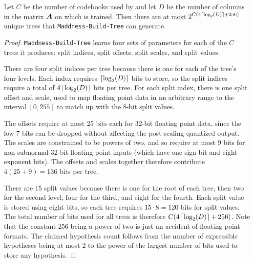 \begin{lemma} \label{lemma:ntrees}
Let $C$ be the number of codebooks used by \oursp and let $D$ be the number of columns in the matrix $\tilde{\bm{A}}$ on which \oursp is trained. Then there are at most $2^{C (4\left \lceil \log_2(D) \right \rceil + 256)}$ unique trees that \texttt{Maddness-Build-Tree} can generate.
\end{lemma}
\begin{proof}
\texttt{Maddness-Build-Tree} learns four sets of parameters for each of the $C$ trees it produces: split indices, split offsets, split scales, and split values.

There are four split indices per tree because there is one for each of the tree's four levels. Each index requires $\left \lceil \log_2(D) \right \rceil$ bits to store, so the split indices require a total of $4 \left \lceil \log_2(D) \right \rceil$ bits per tree. For each split index, there is one split offset and scale, used to map floating point data in an arbitrary range to the interval $[0, 255]$ to match up with the 8-bit split values.

The offsets require at most 25 bits each for 32-bit floating point data, since the low 7 bits can be dropped without affecting the post-scaling quantized output. The scales are constrained to be powers of two, and so require at most 9 bits for non-subnormal 32-bit floating point inputs (which have one sign bit and eight exponent bits). The offsets and scales together therefore contribute $4 (25 + 9) = 136$ bits per tree.

There are $15$ split values because there is one for the root of each tree, then two for the second level, four for the third, and eight for the fourth. Each split value is stored using eight bits, so each tree requires $15 \cdot 8 = 120$ bits for split values. The total number of bits used for all trees is therefore $C(4 \left \lceil \log_2(D) \right \rceil + 256)$. Note that the constant 256 being a power of two is just an accident of floating point formats. The claimed hypothesis count follows from the number of expressible hypotheses being at most $2$ to the power of the largest number of bits used to store any hypothesis.
\end{proof}


